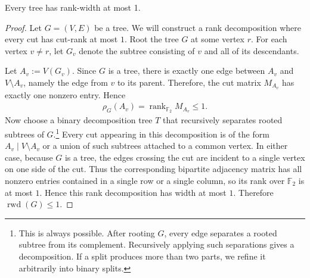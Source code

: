 \begin{lemma}
\label{lemma:tree-rank-width-1}
Every tree has rank-width at most 1.
\end{lemma}

\begin{proof}
Let $G=(V,E)$ be a tree. We will construct a rank decomposition where every cut has cut-rank at most $1$. Root the tree $G$ at some vertex $r$. For each vertex $v \neq r$, let $G_v$ denote the subtree consisting of $v$ and all of its descendants.

Let $A_v := V(G_v)$. Since $G$ is a tree, there is exactly one edge between $A_v$ and $V \setminus A_v$, namely the edge from $v$ to its parent. Therefore, the cut matrix $M_{A_v}$ has exactly one nonzero entry. Hence
\begin{align}
    \rho_G(A_v)
    =
    \operatorname{rank}_{\mathbb F_2} M_{A_v}
    \leq 1.
\end{align}
Now choose a binary decomposition tree $T$ that recursively separates rooted subtrees of $G$.\footnote{This is always possible. After rooting $G$, every edge separates a rooted subtree from its complement. Recursively applying such separations gives a decomposition. If a split produces more than two parts, we refine it arbitrarily into binary splits.} Every cut appearing in this decomposition is of the form $A_v \mid V \setminus A_v$ or a union of such subtrees attached to a common vertex. In either case, because $G$ is a tree, the edges crossing the cut are incident to a single vertex on one side of the cut. Thus the corresponding bipartite adjacency matrix has all nonzero entries contained in a single row or a single column, so its rank over $\mathbb F_2$ is at most $1$. Hence this rank decomposition has width at most $1$. Therefore $\operatorname{rwd}(G) \leq 1$.
\end{proof}

